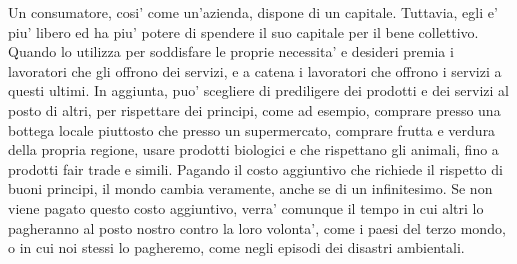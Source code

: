 Un consumatore, cosi' come un'azienda, dispone di un capitale. Tuttavia, egli e' piu' libero ed ha piu' potere di spendere il suo capitale per il bene collettivo. Quando lo utilizza per soddisfare le proprie necessita' e desideri premia i lavoratori che gli offrono dei servizi, e a catena i lavoratori che offrono i servizi a questi ultimi. In aggiunta, puo' scegliere di prediligere dei prodotti e dei servizi al posto di altri, per rispettare dei principi, come ad esempio, comprare presso una bottega locale piuttosto che presso un supermercato, comprare frutta e verdura della propria regione, usare prodotti biologici e che rispettano gli animali, fino a prodotti fair trade e simili. Pagando il costo aggiuntivo che richiede il rispetto di buoni principi, il mondo cambia veramente, anche se di un infinitesimo. Se non viene pagato questo costo aggiuntivo, verra' comunque il tempo in cui altri lo pagheranno al posto nostro contro la loro volonta', come i paesi del terzo mondo, o in cui noi stessi lo pagheremo, come negli episodi dei disastri ambientali.
